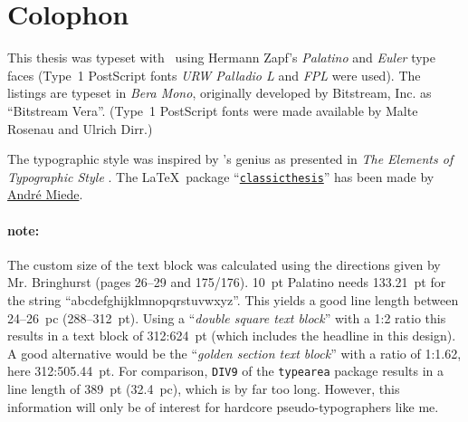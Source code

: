 \pagestyle{empty}

\hfill

\vfill


\section*{Colophon}
This thesis was typeset with \LaTeXe\ using Hermann Zapf's \emph{Palatino} and \emph{Euler} type faces (Type~1 PostScript fonts \emph{URW Palladio L} and \emph{FPL} were used). The listings are typeset in \emph{Bera Mono}, originally developed by Bitstream, Inc. as ``Bitstream Vera''. (Type~1 PostScript fonts were made available by Malte Rosenau and Ulrich Dirr.)

The typographic style was inspired by 's genius as presented in \emph{The Elements of Typographic Style} \citep{bringhurst:2002}. The \LaTeX\ package ``\href{http://www.ctan.org/tex-archive/macros/latex/contrib/classicthesis/}{\texttt{classicthesis}}'' has been made by \href{http://www.miede.de}{André Miede}.

\paragraph{note:} The custom size of the text block was calculated using the directions given by Mr. Bringhurst (pages 26--29 and 175/176). 10~pt Palatino needs  133.21~pt for the string ``abcdefghijklmnopqrstuvwxyz''. This yields a good line length between 24--26~pc (288--312~pt). Using a ``\emph{double square text block}'' with a 1:2 ratio this results in a text block of 312:624~pt (which includes the headline in this design). A good alternative would be the ``\emph{golden section text block}'' with a ratio of 1:1.62, here 312:505.44~pt. For comparison, \texttt{DIV9} of the \texttt{typearea} package results in a line length of 389~pt (32.4~pc), which is by far too long. However, this information will only be of interest for hardcore pseudo-typographers like me.
%
%

\bigskip

\noindent\finalVersionString